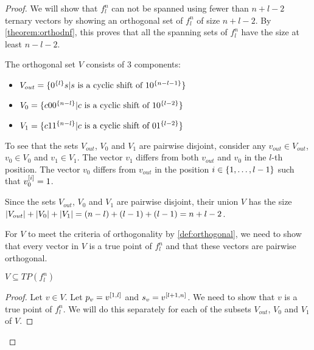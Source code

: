 \begin{proof}
We will show that $f_l^n$ can not be spanned
using fewer than $n+l-2$ ternary vectors
by showing an orthogonal set of $f_l^n$ of size $n+l-2$.
By \cref{theorem:orthodnf},
this proves that all the spanning sets of $f_l^n$
have the size at least $n-l-2$.

The orthogonal set $V$ consists of 3 components:
\begin{itemize}
\item
$V_{out} = \{0^{\{l\}} s
| s \text{ is a cyclic shift of } 1 0^{\{n-l-1\}}\}$
\item
$V_0 = \{c 0 0^{\{n-l\}}
| c \text{ is a cyclic shift of } 1 0^{\{l-2\}}\}$
\item
$V_1 = \{c 1 1^{\{n-l\}}
| c \text{ is a cyclic shift of } 0 1^{\{l-2\}}\}$
\end{itemize}

To see that the sets $V_{out}$, $V_0$ and $V_1$
are pairwise disjoint,
consider any $v_{out} \in V_{out}$,
$v_0 \in V_0$ and $v_1 \in V_1$.
The vector $v_1$ differs from both $v_{out}$ and $v_0$
in the $l$-th position.
The vector $v_0$ differs from $v_{out}$
in the position $i \in \{1, \ldots, l-1\}$
such that $v_0^{[i]} = 1$.

Since the sets $V_{out}$, $V_0$ and $V_1$
are pairwise disjoint,
their union $V$
has the size
$\lvert V_{out}\rvert + \lvert V_0\rvert + \lvert V_1\rvert
= (n-l) + (l-1) + (l-1) = n+l-2$.

For $V$ to meet the criteria of orthogonality
by \cref{def:orthogonal},
we need to show that every vector in $V$
is a true point of $f_l^n$
and that
these vectors are pairwise orthogonal.

\begin{claim}
$V \subseteq TP(f_l^n)$
\end{claim}

\begin{proof}

Let $v \in V$.
Let $p_v = v^{[1, l]}$
and $s_v = v^{[l+1, n]}$.
We need to show that $v$ is a true point of $f_l^n$.
We will do this separately for each of the subsets
$V_{out}$, $V_0$ and $V_1$ of $V$.


\end{proof}
\end{proof}
